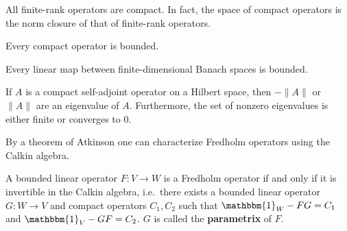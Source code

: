     \begin{property}
        All finite-rank operators are compact. In fact, the space of compact operators is the norm closure of that of finite-rank operators.
    \end{property}

    \begin{property}
        Every compact operator is bounded.
    \end{property}
    \begin{result}
        Every linear map between finite-dimensional Banach spaces is bounded.
    \end{result}

    \begin{property}
        If $A$ is a compact self-adjoint operator on a Hilbert space, then $-\|A\|$ or $\|A\|$ are an eigenvalue of $A$. Furthermore, the set of nonzero eigenvalues is either finite or converges to 0.
    \end{property}



    By a theorem of Atkinson one can characterize Fredholm operators using the Calkin algebra.
    \begin{property}[Atkinson]
        A bounded linear operator $F:V\rightarrow W$ is a Fredholm operator if and only if it is invertible in the Calkin algebra, i.e.~there exists a bounded linear operator $G:W\rightarrow V$ and compact operators $C_1,C_2$ such that $\mathbbm{1}_W-FG=C_1$ and $\mathbbm{1}_V-GF=C_2$. $G$ is called the \textbf{parametrix} of $F$.
    \end{property}


